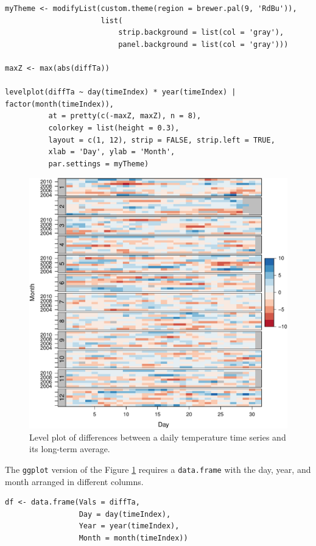 \documentclass[smallroyalvopaper]{memoir}
\begin{document}
\lstset{language=r,label= ,caption= ,captionpos=b,numbers=none}
\begin{lstlisting}
myTheme <- modifyList(custom.theme(region = brewer.pal(9, 'RdBu')),
                      list(
                          strip.background = list(col = 'gray'),
                          panel.background = list(col = 'gray')))

maxZ <- max(abs(diffTa))

levelplot(diffTa ~ day(timeIndex) * year(timeIndex) | factor(month(timeIndex)),
          at = pretty(c(-maxZ, maxZ), n = 8),
          colorkey = list(height = 0.3),
          layout = c(1, 12), strip = FALSE, strip.left = TRUE,
          xlab = 'Day', ylab = 'Month', 
          par.settings = myTheme)

\end{lstlisting}

\begin{figure}[htbp]
\centering
\includegraphics[width=.9\linewidth]{figs/diffTa_levelplot.pdf}
\caption{Level plot of differences between a daily temperature time series and its long-term average. \label{fig:diffTa_level}}
\end{figure}

The \texttt{ggplot} version of the Figure  \ref{fig:diffTa_level} requires a \texttt{data.frame} with the day, year, and month arranged in different columns.
\lstset{language=r,label= ,caption= ,captionpos=b,numbers=none}
\begin{lstlisting}
df <- data.frame(Vals = diffTa,
                 Day = day(timeIndex),
                 Year = year(timeIndex),
                 Month = month(timeIndex))
\end{lstlisting}
\end{document}
